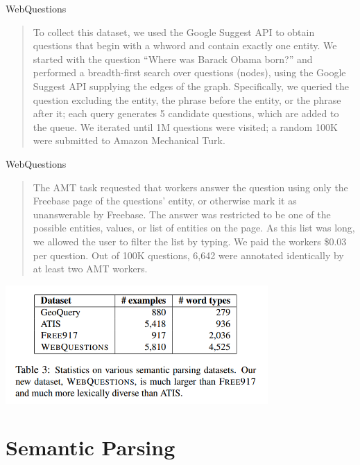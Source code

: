 \documentclass{beamer}
\begin{document}
\begin{frame}{WebQuestions}
  \begin{quote}
    To collect this dataset, we used the Google Suggest API to obtain
    questions that begin with a whword and contain exactly one
    entity. We started with the question “Where was Barack Obama
    born?”  and performed a breadth-first search over questions
    (nodes), using the Google Suggest API supplying the edges of the
    graph. Specifically, we queried the question excluding the entity,
    the phrase before the entity, or the phrase after it; each query
    generates 5 candidate questions, which are added to the queue.  We
    iterated until 1M questions were visited; a random 100K were
    submitted to Amazon Mechanical Turk.
  \end{quote}
\end{frame}

\begin{frame}{WebQuestions}
  \begin{quote}
    The AMT task requested that workers answer the question using only
    the Freebase page of the questions’ entity, or otherwise mark it
    as unanswerable by Freebase. The answer was restricted to be one
    of the possible entities, values, or list of entities on the
    page. As this list was long, we allowed the user to filter the
    list by typing. We paid the workers \$0.03 per question. Out of
    100K questions, 6,642 were annotated identically by at least two
    AMT workers.
  \end{quote}
\end{frame}

\begin{frame}
  \begin{center}
    \includegraphics[width=10cm]{webquestions}
  \end{center}
\end{frame}


\section{Semantic Parsing}
\end{document}
